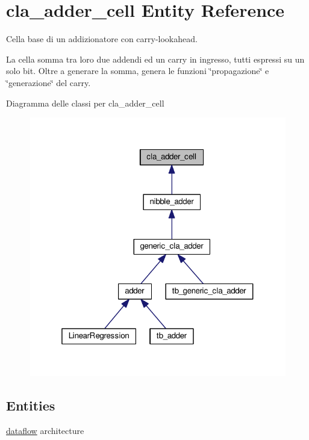 \hypertarget{classcla__adder__cell}{}\section{cla\+\_\+adder\+\_\+cell Entity Reference}
\label{classcla__adder__cell}


Cella base di un addizionatore con carry-\/lookahead.

La cella somma tra loro due addendi ed un carry in ingresso, tutti espressi su un solo bit. Oltre a generare la somma, genera le funzioni \char`\"{}propagazione\char`\"{} e \char`\"{}generazione\char`\"{} del carry.  




Diagramma delle classi per cla\+\_\+adder\+\_\+cell
\nopagebreak
\begin{figure}[H]
\begin{center}
\leavevmode
\includegraphics[width=319pt]{classcla__adder__cell__inherit__graph}
\end{center}
\end{figure}
\subsection*{Entities}
\begin{DoxyCompactItemize}
\item 
\hyperlink{classcla__adder__cell_1_1dataflow}{dataflow} architecture
\end{DoxyCompactItemize}
